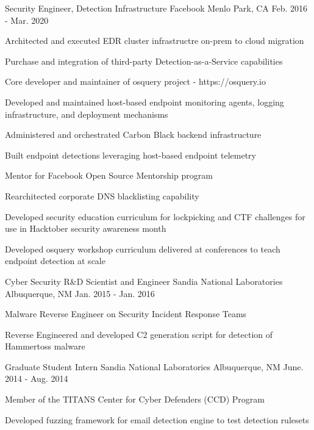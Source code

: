 \begin{cventries}
\cventry
{Security Engineer, Detection Infrastructure} %
{Facebook} %
{Menlo Park, CA} %
{Feb. 2016 - Mar. 2020} %
{ %
\begin{cvitems}
\item {Architected and executed EDR cluster infrastructre on-prem to cloud migration}
\item {Purchase and integration of third-party Detection-as-a-Service capabilities}
\item {Core developer and maintainer of osquery project - https://osquery.io}
\item {Developed and maintained host-based endpoint monitoring agents, logging infrastructure, and deployment mechanisms}
\item {Administered and orchestrated Carbon Black backend infrastructure}
\item {Built endpoint detections leveraging host-based endpoint telemetry}
\item {Mentor for Facebook Open Source Mentorship program}
\item {Rearchitected corporate DNS blacklisting capability}
\item {Developed security education curriculum for lockpicking and CTF challenges for use in Hacktober security awareness month}
\item {Developed osquery workshop curriculum delivered at conferences to teach endpoint detection at scale}
\end{cvitems}
}


\cventry
{Cyber Security R\&D Scientist and Engineer} %
{Sandia National Laboratories} %
{Albuquerque, NM} %
{Jan. 2015 - Jan. 2016} %
{ %
\begin{cvitems}
\item {Malware Reverse Engineer on Security Incident Response Teams}
\item {Reverse Engineered and developed C2 generation script for detection of Hammertoss malware}
\end{cvitems}
}


\cventry
{Graduate Student Intern} %
{Sandia National Laboratories} %
{Albuquerque, NM} %
{June. 2014 - Aug. 2014} %
{ %
\begin{cvitems}
\item {Member of the TITANS Center for Cyber Defenders (CCD) Program}
\item {Developed fuzzing framework for email detection engine to test detection rulesets}
\end{cvitems}
}


\end{cventries}
